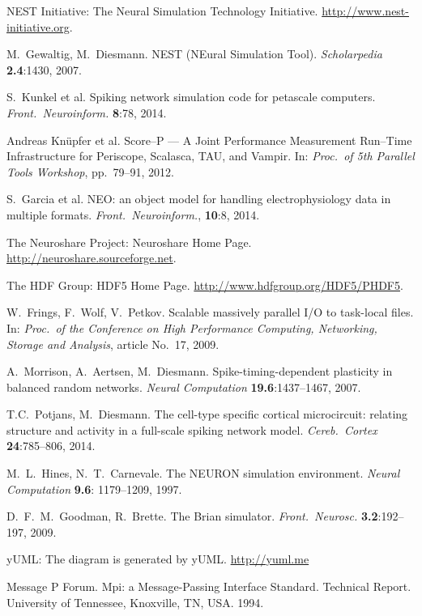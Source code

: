 \documentclass[]{YIC2015}
\begin{document}
\begin{thebibliography}{99}

 NEST Initiative: The Neural Simulation
  Technology Initiative. \url{http://www.nest-initiative.org}.

  M.~Gewaltig, M.~Diesmann. NEST (NEural Simulation
  Tool). \textit{Scholarpedia} %
  \textbf{2.4}:1430, 2007.

 S.~Kunkel et al. Spiking network simulation code for
  petascale computers.  \textit{Front.~Neuroinform.} \textbf{8}:78,
  2014.

 Andreas Kn\"upfer et al. Score--P --- A Joint
  Performance Measurement Run--Time Infrastructure for Periscope,
  Scalasca, TAU, and Vampir. In: \textit{Proc.~of 5th Parallel Tools
    Workshop}, pp.~79--91, 2012.

 S.~Garcia et al. NEO: an object model for handling
  electrophysiology data in multiple formats.
  \textit{Front.~Neuroinform.}, \textbf{10}:8, 2014.

 The Neuroshare Project: Neuroshare Home
  Page. \url{http://neuroshare.sourceforge.net}.

 The HDF Group: HDF5 Home
  Page. \url{http://www.hdfgroup.org/HDF5/PHDF5}.

 W.~Frings, F.~Wolf, V.~Petkov. Scalable
  massively parallel I/O to task-local files.  In: \textit{Proc.~of
  the Conference on High Performance Computing, Networking,
    Storage and Analysis}, article No.~17, 2009.

 A.~Morrison, A.~Aertsen,
  M.~Diesmann. Spike-timing-dependent plasticity in balanced random
  networks. \textit{Neural Computation} \textbf{19.6}:1437--1467,
  2007.

 T.C.~Potjans, M.~Diesmann. The cell-type specific
  cortical microcircuit: relating structure and activity in a
  full-scale spiking network model. \textit{Cereb.~Cortex}
  \textbf{24}:785--806, 2014.

 M.~L.~Hines, N.~T.~Carnevale. The NEURON simulation
  environment. \textit{Neural Computation} \textbf{9.6}: 1179--1209,
  1997.

 D.~F.~M.~Goodman, R.~Brette. The Brian
  simulator. \textit{Front.~Neurosc.} \textbf{3.2}:192--197, 2009.
  
 yUML: The diagram is generated by yUML. \url{http://yuml.me}

 Message P Forum. Mpi: a Message-Passing Interface
  Standard. Technical Report. University of Tennessee, Knoxville, TN,
  USA. 1994.

\end{thebibliography}
\end{document}
